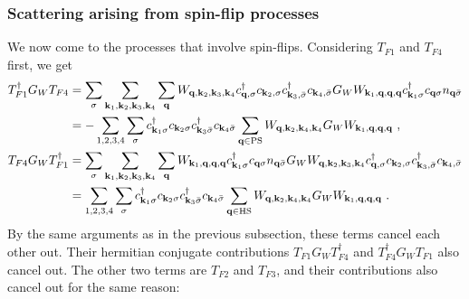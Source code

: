 \subsubsection*{Scattering arising from spin-flip processes}
We now come to the processes that involve spin-flips. Considering \(T_{F1}\) and \(T_{F4}\) first, we get
\begin{equation}\begin{aligned}
	T_{F1}^\dagger G_W T_{F4} &= \sum_\sigma\sum_{{\bf k}_1, {\bf k}_2, {\bf k}_3, {\bf k}_4} \sum_{\bf q} W_{{\bf q},{\bf k}_2,{\bf k}_3,{\bf k}_4}c^\dagger_{{\bf q},\sigma}c_{{\bf k}_2,\sigma}c^\dagger_{{\bf k}_3,\bar\sigma}c_{{\bf k}_4,\bar\sigma} G_W W_{{\bf k}_1, {\bf q}, {\bf q}, {\bf q}}  c^\dagger_{{\bf k}_1\sigma} c_{{\bf q}\sigma} n_{{\bf q} \bar \sigma} \\
							  &= -\sum_{1,2,3,4}\sum_\sigma c^\dagger_{{\bf k}_1\sigma} c_{{\bf k}_2\sigma} c^\dagger_{{\bf k}_3\bar\sigma} c_{{\bf k}_4\bar \sigma} \sum_{\bf q \in \text{PS}} W_{{\bf q}, {\bf k}_2, {\bf k}_4, {\bf k}_4} G_W W_{{\bf k}_1, {\bf q}, {\bf q}, {\bf q}}~,\\
	T_{F4} G_W T_{F1}^\dagger &= \sum_\sigma\sum_{{\bf k}_1, {\bf k}_2, {\bf k}_3, {\bf k}_4} \sum_{\bf q}W_{{\bf k}_1, {\bf q}, {\bf q}, {\bf q}}  c^\dagger_{{\bf k}_1\sigma} c_{{\bf q}\sigma} n_{{\bf q} \bar \sigma} G_W W_{{\bf q},{\bf k}_2,{\bf k}_3,{\bf k}_4}c^\dagger_{{\bf q},\sigma}c_{{\bf k}_2,\sigma}c^\dagger_{{\bf k}_3,\bar\sigma}c_{{\bf k}_4,\bar\sigma}  \\
							  &= \sum_{1,2,3,4}\sum_\sigma c^\dagger_{{\bf k}_1\sigma} c_{{\bf k}_2\sigma} c^\dagger_{{\bf k}_3\bar\sigma} c_{{\bf k}_4\bar \sigma} \sum_{\bf q \in \text{HS}} W_{{\bf q}, {\bf k}_2, {\bf k}_4, {\bf k}_4} G_W W_{{\bf k}_1, {\bf q}, {\bf q}, {\bf q}}~.
\end{aligned}\end{equation}
By the same arguments as in the previous subsection, these terms cancel each other out. Their hermitian conjugate contributions \(T_{F1} G_W T_{F4}^\dagger\) and \(T_{F4}^\dagger G_W T_{F1}\) also cancel out. The other two terms are \(T_{F2}\) and \(T_{F3}\), and their contributions also cancel out for the same reason:
